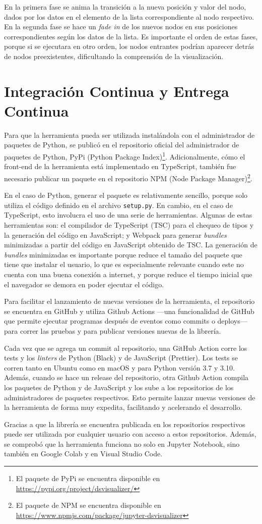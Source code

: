 En la primera fase se anima la transición a la nueva posición y valor del nodo, dados por los datos en el elemento de la lista correspondiente al nodo respectivo. En la segunda fase se hace un \textit{fade in} de los nuevos nodos en sus posiciones correspondientes según los datos de la lista. Es importante el orden de estas fases, porque si se ejecutara en otro orden, los nodos entrantes podrían aparecer detrás de nodos preexistentes, dificultando la comprensión de la visualización.

\section{Integración Continua y Entrega Continua}

Para que la herramienta pueda ser utilizada instalándola con el administrador de paquetes de Python, se publicó en el repositorio oficial del administrador de paquetes de Python, PyPi (Python Package Index)\footnote{El paquete de PyPi se encuentra disponible en \url{https://pypi.org/project/dsvisualizer/}}. Adicionalmente, cómo el front-end de la herramienta está implementado en TypeScript, también fue necesario publicar un paquete en el repositorio NPM (Node Package Manager)\footnote{El paquete de NPM se encuentra disponible en \url{https://www.npmjs.com/package/jupyter-dsvisualizer}}.

En el caso de Python, generar el paquete es relativamente sencillo, porque solo utiliza el código definido en el archivo \texttt{setup.py}. En cambio, en el caso de TypeScript, esto involucra el uso de una serie de herramientas. Algunas de estas herramientas son: el compilador de TypeScript (TSC) para el chequeo de tipos y la generación del código en JavaScript; y Webpack para generar \textit{bundles} minimizadas a partir del código en JavaScript obtenido de TSC. La generación de \textit{bundles} minimizadas es importante porque reduce el tamaño del paquete que tiene que instalar el usuario, lo que es especialmente relevante cuando este no cuenta con una buena conexión a internet, y porque reduce el tiempo inicial que el navegador se demora en poder ejecutar el código.

Para facilitar el lanzamiento de nuevas versiones de la herramienta, el repositorio se encuentra en GitHub y utiliza Github Actions ---una funcionalidad de GitHub que permite ejecutar programas después de eventos como commits o deploys--- para correr las pruebas y para publicar versiones nuevas de la librería.

Cada vez que se agrega un commit al repositorio, una GitHub Action corre los tests y los \textit{linters} de Python (Black) y de JavaScript (Prettier). Los tests se corren tanto en Ubuntu como en macOS y para Python versión 3.7 y 3.10. Además, cuando se hace un release del repositorio, otra Github Action compila los paquetes de Python y de JavaScript y los sube a los repositorios de los administradores de paquetes respectivos. Esto permite lanzar nuevas versiones de la herramienta de forma muy expedita, facilitando y acelerando el desarrollo.

Gracias a que la librería se encuentra publicada en los repositorios respectivos puede ser utilizada por cualquier usuario con acceso a estos repositorios. Además, se comprobó que la herramienta funciona no solo en Jupyter Notebook, sino también en Google Colab y en Visual Studio Code.
